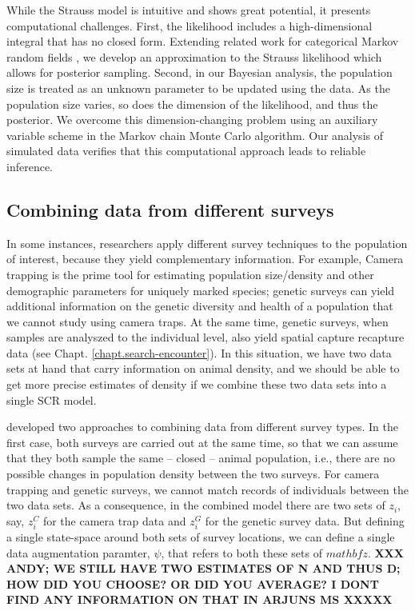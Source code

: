 While the Strauss model is intuitive and shows great potential, it
presents computational challenges.  First, the likelihood includes a
high-dimensional integral that has no closed form.  Extending related
work for categorical Markov random fields
\citep{green:2002,smith:2006}, we develop an approximation to the
Strauss likelihood which allows for posterior sampling.  Second, in
our Bayesian analysis, the population size is treated as an unknown
parameter to be updated using the data.  As the population size
varies, so does the dimension of the likelihood, and thus the
posterior.  We overcome this dimension-changing problem using an
auxiliary variable scheme in the Markov chain Monte Carlo algorithm.
Our analysis of simulated data verifies that this computational
approach leads to reliable inference.


\subsection{Combining data from different surveys}

In some instances, researchers apply different survey techniques to
the population of interest, because they yield complementary
information. For example, Camera trapping is the prime tool for
estimating population size/density and other demographic parameters
for uniquely marked species; genetic surveys can yield additional
information on the genetic diversity and health of a population that
we cannot study using camera traps. At the same time, genetic surveys,
when samples are analyszed to the individual level, also yield spatial
capture recapture data (see Chapt. \ref{chapt.search-encounter}). In
this situation, we have two data sets at hand that carry information
on animal density, and we should be able to get more precise estimates
of density if we combine these two data sets into a single SCR model.

\citet{gopalaswamy_etal:2012} developed two approaches to combining
data from different survey types. In the first case, both surveys are
carried out at the same time, so that we can assume that they both
sample the same -- closed -- animal population, i.e., there are no
possible changes in population density between the two surveys. For
camera trapping and genetic surveys, we cannot match records of
individuals between the two data sets. As a consequence, in the
combined model there are two sets of $z_i$, say, $z^{C}_{i}$ for the
camera trap data and $z^{G}_{i}$ for the genetic survey data. But
defining a single state-space around both sets of survey locations, we
can define a single data augmentation paramter, $\psi$, that refers to
both these sets of $mathbf{z}$.  {\bf XXX ANDY; WE STILL HAVE TWO ESTIMATES
OF N AND THUS D; HOW DID YOU CHOOSE? OR DID YOU AVERAGE? I DONT FIND
ANY INFORMATION ON THAT IN ARJUNS MS XXXXX}

